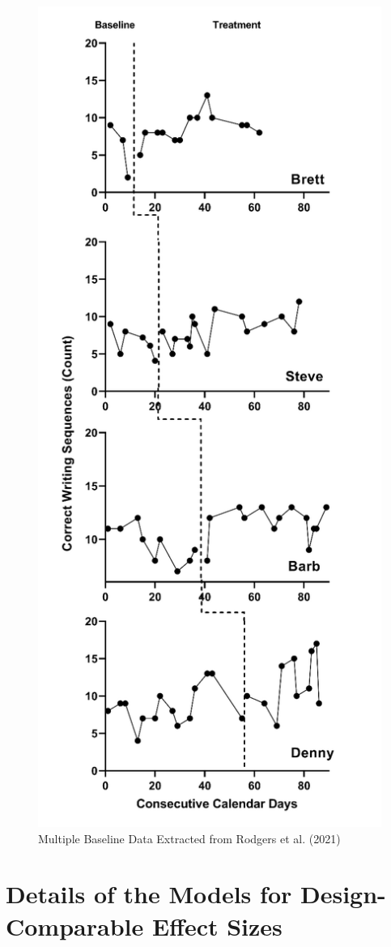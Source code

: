 \documentclass[
]{book}
\begin{document}
\begin{figure}
\includegraphics[width=0.6\linewidth]{images/Rodgers2020} \caption{Multiple Baseline Data Extracted from Rodgers et al. (2021)}\label{fig:Rodgers-raw-2021}
\end{figure}

\hypertarget{details-of-the-models-for-design-comparable-effect-sizes-1}{%
\section{Details of the Models for Design-Comparable Effect Sizes}\label{details-of-the-models-for-design-comparable-effect-sizes-1}}
\end{document}
